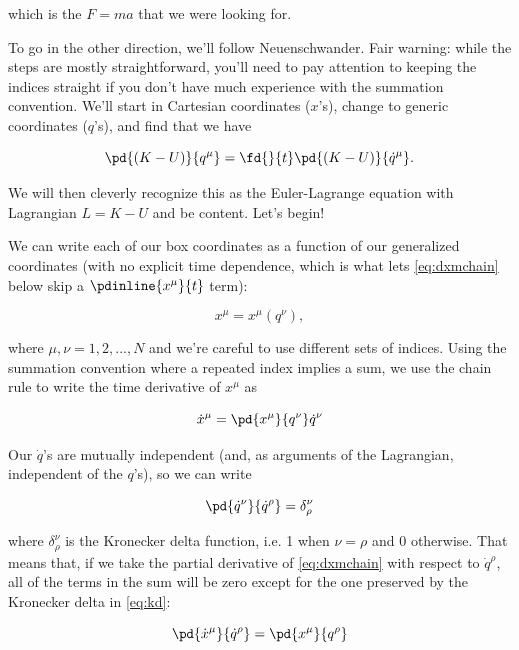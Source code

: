 \documentclass[12pt]{article}
\numberwithin{equation}{section}
\begin{document}
which is the $F=ma$ that we were looking for.


To go in the other direction, we'll follow Neuenschwander. Fair warning: while the steps are mostly straightforward, you'll need to pay attention to keeping the indices straight if you don't have much experience with the summation convention. We'll start in Cartesian coordinates ($x$'s), change to generic coordinates ($q$'s), and find that we have

\begin{equation}
  \label{eq:elprecursor}
  \pd{(K-U)}{q^\mu} = \fd{}{t}\pd{(K-U)}{\dot{q}^\mu}.
\end{equation}

We will then cleverly recognize this as the Euler-Lagrange equation with Lagrangian $L=K-U$ and be content. Let's begin!

We can write each of our box coordinates as a function of our generalized coordinates (with no explicit time dependence, which is what lets \eqref{eq:dxmchain} below skip a $\pdinline{x^\mu}{t}$ term):

\begin{equation}
  x^\mu = x^\mu(q^\nu),
\end{equation}

where $\mu,\nu=1,2,...,N$ and we're careful to use different sets of indices. Using the summation convention where a repeated index implies a sum, we use the chain rule to write the time derivative of $x^\mu$ as

\begin{equation}
  \label{eq:dxmchain}
  \dot{x}^\mu = \pd{x^\mu}{q^\nu}\dot{q}^\nu
\end{equation}

Our $\dot{q}$'s are mutually independent (and, as arguments of the Lagrangian, independent of the $q$'s), so we can write

\begin{equation}
  \label{eq:kd}
  \pd{\dot{q}^\nu}{\dot{q}^\rho} = \delta^\nu_\rho
\end{equation}

where $\delta^\nu_\rho$ is the Kronecker delta function, i.e. 1 when $\nu=\rho$ and 0 otherwise. That means that, if we take the partial derivative of \ref{eq:dxmchain} with respect to $\dot{q}^\rho$, all of the terms in the sum will be zero except for the one preserved by the Kronecker delta in \ref{eq:kd}:

\begin{equation}
  \label{eq:pdxdqd}
  \pd{\dot{x}^\mu}{\dot{q}^\rho} = \pd{x^\mu}{q^\rho}
\end{equation}
\end{document}
